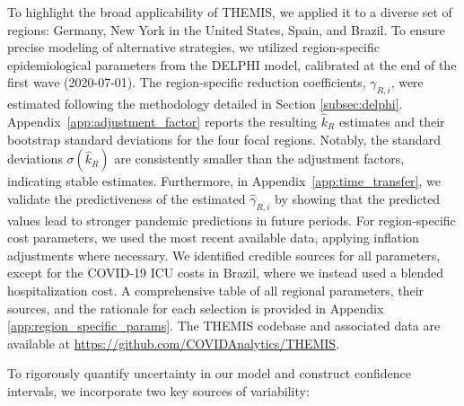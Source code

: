 \documentclass[msom,blindrev]{informs3} %
\newcommand{\rev}[1]{{\color{blue}#1}}
\begin{document}
To highlight the broad applicability of THEMIS, we applied it to a diverse set of regions: Germany, New York in the United States, Spain, and Brazil. To ensure precise modeling of alternative strategies, we utilized region-specific epidemiological parameters from the DELPHI model, calibrated at the end of the first wave (2020-07-01). The region-specific reduction coefficients, $\gamma_{R,i}$, were estimated following the methodology detailed in Section \ref{subsec:delphi}. \rev{Appendix~\ref{app:adjustment_factor} reports the resulting $\hat{k}_R$ estimates and their bootstrap standard deviations for the four focal regions. Notably, the standard deviations $\sigma(\hat{k}_R)$ are consistently smaller than the adjustment factors, indicating stable estimates. Furthermore, in Appendix~\ref{app:time_transfer}, we validate the predictiveness of the estimated $\hat\gamma_{R,i}$ by showing that the predicted values lead to stronger pandemic predictions in future periods.} For region-specific cost parameters, we used the most recent available data, applying inflation adjustments where necessary. We identified credible sources for all parameters, except for the COVID-19 ICU costs in Brazil, where we instead used a blended hospitalization cost. A comprehensive table of all regional parameters, their sources, and the rationale for each selection is provided in Appendix \ref{app:region_specific_params}. The THEMIS codebase and associated data are available at \url{https://github.com/COVIDAnalytics/THEMIS}.

To rigorously quantify uncertainty in our model and construct confidence intervals, we incorporate two key sources of variability:
\end{document}
